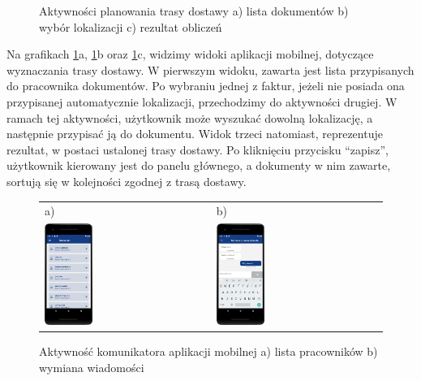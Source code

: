 \begin{figure}[ht]
\begin{tabular}{l l l}
	\end{tabular}
  \caption{Aktywności planowania trasy dostawy a) lista dokumentów b) wybór lokalizacji c) rezultat obliczeń}
  \label{fig:gui-mobilna-zrzut678}
\end{figure}

Na grafikach \ref{fig:gui-mobilna-zrzut678}a, \ref{fig:gui-mobilna-zrzut678}b oraz \ref{fig:gui-mobilna-zrzut678}c, widzimy widoki aplikacji mobilnej, dotyczące wyznaczania trasy dostawy. W pierwszym widoku, zawarta jest lista przypisanych do pracownika dokumentów. Po wybraniu jednej z faktur, jeżeli nie posiada ona przypisanej automatycznie lokalizacji, przechodzimy do aktywności drugiej. W ramach tej aktywności, użytkownik może wyszukać dowolną lokalizację, a następnie przypisać ją do dokumentu. Widok trzeci natomiast, reprezentuje rezultat, w postaci ustalonej trasy dostawy. Po kliknięciu przycisku "`zapisz"', użytkownik kierowany jest do panelu głównego, a dokumenty w nim zawarte, sortują się w kolejności zgodnej z trasą dostawy.

\newpage

\begin{figure}[ht]
  \centering
	\begin{tabular}{@{}ll@{}}
	a) & b) \\
  \includegraphics[width=0.3\textwidth]{rys04/mobilna/zrzut9} & 
	\includegraphics[width=0.3\textwidth]{rys04/mobilna/zrzut10}
	\end{tabular}
  \caption{Aktywność komunikatora aplikacji mobilnej a) lista pracowników b) wymiana wiadomości}
  \label{fig:gui-mobilna-zrzut910}
\end{figure}

